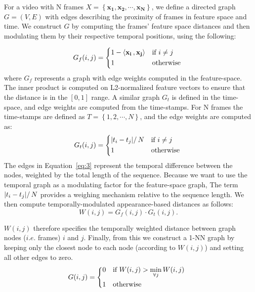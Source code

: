 \documentclass[10pt,twocolumn,letterpaper]{article}
\begin{document}
For a video with N frames $X=\left \{\mathbf{x_1}, \mathbf{x_2}, \cdots, \mathbf{x_N}\right \}$, we define a directed graph $G=(V,E)$ with edges describing the proximity of frames in feature space and time. We construct $G$ by computing the frames' feature space distances and then modulating them by their respective temporal positions, using the following: 


\begin{equation}
G_f(i,j) =
\begin{dcases*}
\text{$1 - \langle\mathbf{x_i}\,, \mathbf{x_j}\rangle $}                        & if $i \neq j$\\
   1                         & otherwise
\end{dcases*} 
\label{eq:2}
\end{equation}
where $G_f$ represents a graph with edge weights computed in the feature-space. The inner product is computed on L2-normalized feature vectors to ensure that the distance is in the $[0,1]$ range. A similar graph $G_t$ is defined in the time-space, and edge weights are computed from the time-stamps. For N frames the time-stamps are defined as $T=\left \{1, 2,\cdots, N\right \}$, and the edge weights are computed as:
\begin{equation}
G_t(i,j) =
\begin{dcases*}
   \text{$\left |t_i- t_j|\right/N$}          & if $i \neq j$\\
   1                           & otherwise
\end{dcases*} 
\label{eq:3}
\end{equation}
The edges in Equation~\ref{eq:3} represent the temporal difference between the nodes, weighted by the total length of the sequence. Because we want to use the temporal graph as a modulating factor for the feature-space graph, The term $\left |t_i- t_j|\right/N$  provides a
weighing mechanism relative to the sequence length. We then compute temporally-modulated appearance-based distances as follows:
\begin{equation}
   W(i, j) = G_f(i, j) \cdot G_t(i, j).
\label{eq:4}
\end{equation}

$W(i,j)$ therefore specifies the temporally weighted distance between graph nodes ($i.e.$ frames) $i$ and $j$. Finally, from this we construct a 1-NN graph by keeping only the closest node to each node (according to $W(i,j)$) and setting all other edges to zero. 
\begin{equation}
G(i,j) =
\begin{dcases*}
   0                        & if $W(i,j) > \displaystyle\min_{\forall j} W(i,j)$ \\
   1                        & otherwise    
\end{dcases*} \\
\label{eq:5}
\end{equation}
\end{document}

